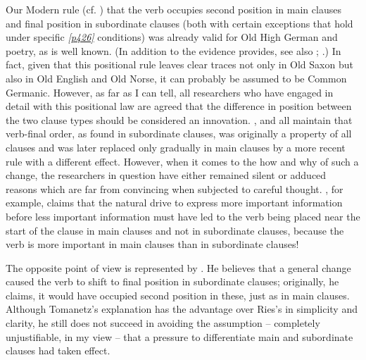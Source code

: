 Our Modern  rule (cf. \citealp[181ff., esp. 195]{Erdmann1886}) that the verb occupies second position in main clauses and final position in subordinate clauses (both with certain exceptions that hold under specific \hyperlink{p426}{\emph{[p426]}} conditions) was already valid for Old High German  and poetry, as is well known. (In addition to the evidence \citeauthor{Erdmann1886} provides, see also \citealp[54ff.]{Tomanetz1879}; \citeyear[381]{Tomanetz1890}.) In fact, given that this positional rule leaves clear traces not only in Old Saxon but also in Old English and Old Norse, it can probably be assumed to be Common Germanic. However, as far as I can tell, all researchers who have engaged in detail with this  positional law are agreed that the difference in position between the two clause types should be considered an innovation. \citet[139ff.]{Bergaigne1877}, \citet[284]{Behaghel1878} and \citet[88ff.]{Ries1880} all maintain that verb-final order, as found in subordinate clauses, was originally a property of all clauses and was later replaced only gradually in main clauses by a more recent rule with a different effect. However, when it comes to the how and why of such a change, the researchers in question have either remained silent or adduced reasons which are far from convincing when subjected to careful thought. \citet{Ries1880}, for example, claims that the natural drive to express more important information before less important information must have led to the verb being placed near the start of the clause in main clauses and not in subordinate clauses, because the verb is more important in main clauses than in subordinate clauses!

The opposite point of view is represented by \citet[82ff.]{Tomanetz1879}. He believes that a general change caused the verb to shift to final position in subordinate clauses; originally, he claims, it would have occupied second position in these, just as in main clauses. Although Tomanetz's explanation has the advantage over Ries's in simplicity and clarity, he still does not succeed in avoiding the assumption -- completely unjustifiable, in my view -- that a pressure to differentiate main and subordinate clauses had taken effect.

